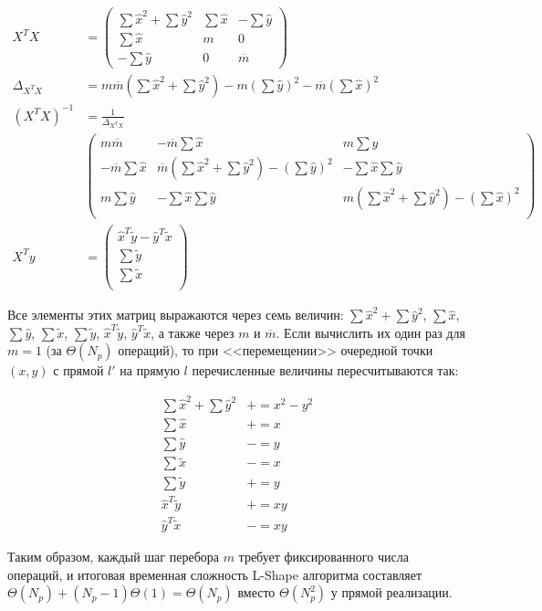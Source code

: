 \begin{equation}
	\begin{aligned}
		X^TX &= \begin{pmatrix}
			\sum{\widehat{x}^2} + \sum{\widehat{y}^2}& \sum\widehat{x} & -\sum\widehat{y} \\
			\sum\widehat{x} & m & 0  \\
			-\sum\widehat{y} & 0 & \overline{m}
		\end{pmatrix}\\
		\Delta_{X^TX} &= m \overline{m}(\sum{\widehat{x}^2} + \sum{\widehat{y}^2}) - m\left(\sum{\widehat{y}}\right)^2 - \overline{m} \left(\sum{\widehat{x}}\right)^2 \\
		\left(X^TX\right)^{-1} &=  \frac{1}{\Delta_{X^TX}} \\ &\begin{pmatrix}
			m \overline{m}& -\overline{m} \sum\widehat{x} & m \sum\widehat{y} \\
			-\overline{m} \sum\widehat{x} & \overline{m} (\sum{\widehat{x}^2} + \sum{\widehat{y}^2}) - \left(\sum\widehat{y}\right)^2& -\sum\widehat{x} \sum\widehat{y} \\
			m\sum\widehat{y} & -\sum\widehat{x} \sum\widehat{y} & m (\sum{\widehat{x}^2} + \sum{\widehat{y}^2}) - \left(\sum\widehat{x}\right)^2 \\
		\end{pmatrix}\\
		X^Ty  &= \begin{pmatrix}
			\widehat{x}^T\widetilde{y} - \widehat{y}^T\widetilde{x} \\
			\sum\widetilde{y} \\
			\sum\widetilde{x} \\
		\end{pmatrix}
	\end{aligned}
	\label{eq:lshape_matrices}
\end{equation}

Все элементы этих матриц выражаются через семь величин: $\sum{\widehat{x}^2} + \sum{\widehat{y}^2}$, $\sum{\widehat{x}}$, $\sum{\widehat{y}}$, $\sum{\widetilde{x}}$, $\sum{\widetilde{y}}$, $\widehat{x}^T\widetilde{y}$, $\widehat{y}^T\widetilde{x}$, а также через $m$ и $\overline{m}$. Если вычислить их один раз для $m=1$ (за $\Theta(N_p)$ операций), то при <<перемещении>> очередной точки $(x,y)$ с прямой $l'$ на прямую $l$ перечисленные величины пересчитываются так:

\begin{equation}
	\begin{aligned}
		\sum{\widehat{x}^2} + \sum{\widehat{y}^2} &+= x^2 - y^2 \\
		\sum{\widehat{x}} &+= x \\
		\sum{\widehat{y}} &-= y \\
		\sum{\widetilde{x}} &-= x\\
		\sum{\widetilde{y}} &+= y \\
		\widehat{x}^T\widetilde{y} &+= xy \\
		\widehat{y}^T\widetilde{x} &-= xy
	\end{aligned}
	\label{eq:lshape_updates}
\end{equation}

Таким образом, каждый шаг перебора $m$ требует фиксированного числа операций, и итоговая временная сложность L-Shape алгоритма составляет $\Theta(N_p) + (N_p-1)\Theta(1) = \Theta(N_p)$ вместо $\Theta(N_p^2)$ у прямой реализации.
